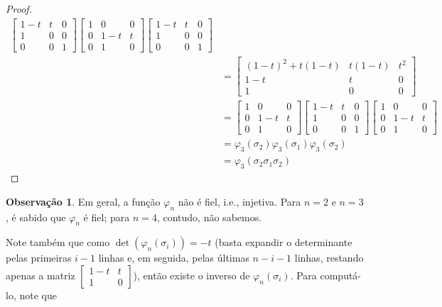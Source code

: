 \documentclass[a4paper,portuguese,11pt,twoside, leqno]{book}
\theoremstyle{definition}
\newtheorem{remark}{Observação}[section]
\begin{document}
\begin{proof}
\begin{align*}
\begin{bmatrix}
		1-t & t & 0 \\
		1 & 0 & 0 \\
		0 & 0 & 1
		\end{bmatrix}\begin{bmatrix}
		1 & 0 & 0 \\
		0 & 1-t & t \\
		0 & 1 & 0
		\end{bmatrix}\begin{bmatrix}
		1-t & t & 0 \\
		1 & 0 & 0 \\
		0 & 0 & 1
		\end{bmatrix} \\
		&= \begin{bmatrix}
		(1-t)^2 +t(1-t) & t(1-t) & t^2 \\
		1-t & t & 0 \\
		1 & 0 & 0
		\end{bmatrix} \\
		&= \begin{bmatrix}
		1 & 0 & 0 \\
		0 & 1-t & t \\
		0 & 1 & 0
		\end{bmatrix}\begin{bmatrix}
		1-t & t & 0 \\
		1 & 0 & 0 \\
		0 & 0 & 1
		\end{bmatrix}\begin{bmatrix}
		1 & 0 & 0 \\
		0 & 1-t & t \\
		0 & 1 & 0
		\end{bmatrix}\\
		&= \varphi_3(\sigma_2)\varphi_3(\sigma_1)\varphi_3(\sigma_2)\\
		&=\varphi_3(\sigma_2\sigma_1\sigma_2)
		\end{align*}
	\end{proof}
	\begin{remark}
		Em geral, a função $\varphi_n$ não é fiel, i.e., injetiva. Para $n=2$ e $n=3$, é sabido que $\varphi_n$ é fiel; para $n=4$, contudo, não sabemos.
	\end{remark}
	\par\vspace{0.3cm} Note também que como $\det(\varphi_n(\sigma_i)) = -t$ (basta expandir o determinante pelas primeiras $i-1$ linhas e, em seguida, pelas últimas $n-i-1$ linhas, restando apenas a matriz $\left[\begin{smallmatrix}
	1-t & t \\
	1 & 0
	\end{smallmatrix}\right]$), então existe o inverso de $\varphi_n(\sigma_i)$. Para computá-lo, note que
\end{document}
